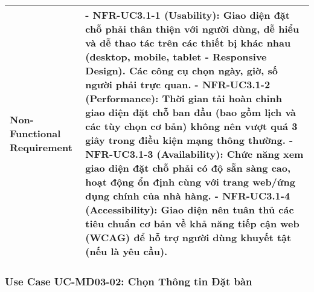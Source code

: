\begin{longtable}{|m{4cm}|p{11cm}|}
\hline
Non-Functional Requirement & - \textbf{NFR-UC3.1-1 (Usability):} Giao diện đặt chỗ phải thân thiện với người dùng, dễ hiểu và dễ thao tác trên các thiết bị khác nhau (desktop, mobile, tablet - Responsive Design). Các công cụ chọn ngày, giờ, số người phải trực quan. \newline - \textbf{NFR-UC3.1-2 (Performance):} Thời gian tải hoàn chỉnh giao diện đặt chỗ ban đầu (bao gồm lịch và các tùy chọn cơ bản) không nên vượt quá 3 giây trong điều kiện mạng thông thường. \newline - \textbf{NFR-UC3.1-3 (Availability):} Chức năng xem giao diện đặt chỗ phải có độ sẵn sàng cao, hoạt động ổn định cùng với trang web/ứng dụng chính của nhà hàng. \newline - \textbf{NFR-UC3.1-4 (Accessibility):} Giao diện nên tuân thủ các tiêu chuẩn cơ bản về khả năng tiếp cận web (WCAG) để hỗ trợ người dùng khuyết tật (nếu là yêu cầu). \\
\hline

\end{longtable}

\subsubsection{Use Case UC-MD03-02: Chọn Thông tin Đặt bàn}

